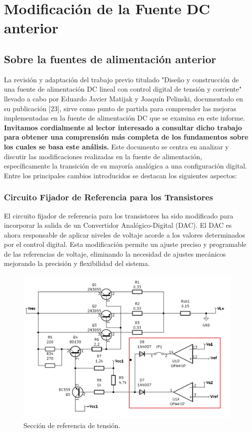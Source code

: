 \chapter{Modificación de la Fuente DC anterior}

\label{C:Sobre la fuente anterior}

\section{Sobre la fuentes de alimentación anterior}
La revisión y adaptación del trabajo previo titulado "Diseño y construcción de una fuente de alimentación DC lineal con control digital de tensión y corriente" llevado a cabo por Eduardo Javier Matijak y Joaquín Pelinski, documentado en su publicación [23], sirve como punto de partida para comprender las mejoras implementadas en la fuente de alimentación DC que se examina en este informe. \textbf{Invitamos cordialmente al lector interesado a consultar dicho trabajo para obtener 
una comprensión más completa de los fundamentos sobre los cuales se basa este análisis.}
Este documento se centra en analizar y discutir las modificaciones realizadas en la fuente de alimentación, específicamente la transición de su mayoría analógica a una configuración digital. Entre los principales cambios introducidos se destacan los siguientes aspectos:

\subsection{Circuito Fijador de Referencia para los Transistores}
El circuito fijador de referencia para los transistores ha sido modificado para incorporar la salida de un Convertidor Analógico-Digital (DAC). El DAC es ahora responsable de aplicar niveles de voltaje acorde a los valores determinados por el control digital. Esta modificación permite un ajuste preciso y programable de las referencias de voltaje, eliminando la necesidad de ajustes mecánicos mejorando la precisión y flexibilidad del sistema.
\begin{figure}[H]
    \centering
    \includegraphics[scale=0.3]{./imagenes/Eliminada1.jpg}
    \caption{Sección de referencia de tensión.}
    \label{F:estructura_archivos}
\end{figure}

